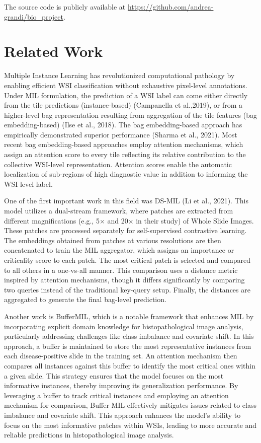\documentclass[10pt,twocolumn]{article}
\begin{document}
The source code is publicly available at \url{https://github.com/andrea-grandi/bio_project}.

\section{Related Work} \label{related}
Multiple Instance Learning has revolutionized computational pathology by enabling efficient WSI classification without exhaustive pixel-level annotations. Under MIL formulation, the prediction of a WSI label can come either directly from the tile predictions (instance-based) (Campanella et al.,2019)\cite{campanella2019clinical}, or from a higher-level bag representation resulting from aggregation of the tile features (bag embedding-based) (Ilse et al., 2018)\cite{ilse2018attention}. The bag embedding-based approach has empirically demonstrated superior performance (Sharma et al., 2021)\cite{conf/midl/SharmaSEMSB21}. Most recent bag embedding-based approaches employ attention mechanisms, which assign an attention score to every tile reflecting its relative contribution to the collective WSI-level representation. Attention scores enable the automatic localization of sub-regions of high diagnostic value in addition to informing the WSI level label.

One of the first important work in this field was DS-MIL (Li et al., 2021)\cite{li2021dualstreammultipleinstancelearning}. This model utilizes a dual-stream framework, where patches are extracted from different magnifications (e.g., 5× and 20× in their study) of Whole Slide Images. These patches are processed separately for self-supervised contrastive learning. The embeddings obtained from patches at various resolutions are then concatenated to train the MIL aggregator, which assigns an importance or criticality score to each patch. The most critical patch is selected and compared to all others in a one-vs-all manner. This comparison uses a distance metric inspired by attention mechanisms, though it differs significantly by comparing two queries instead of the traditional key-query setup. Finally, the distances are aggregated to generate the final bag-level prediction.

Another work is BufferMIL, which is a notable framework that enhances MIL by incorporating explicit domain knowledge for histopathological image analysis, particularly addressing challenges like class imbalance and covariate shift. In this approach, a buffer is maintained to store the most representative instances from each disease-positive slide in the training set. An attention mechanism then compares all instances against this buffer to identify the most critical ones within a given slide. This strategy ensures that the model focuses on the most informative instances, thereby improving its generalization performance. By leveraging a buffer to track critical instances and employing an attention mechanism for comparison, Buffer-MIL effectively mitigates issues related to class imbalance and covariate shift. This approach enhances the model's ability to focus on the most informative patches within WSIs, leading to more accurate and reliable predictions in histopathological image analysis.
\end{document}
